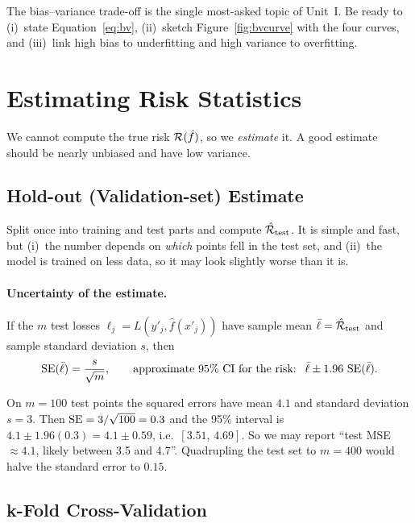 \begin{exam}
The bias--variance trade-off is the single most-asked topic of Unit~I. Be ready to (i)~state Equation~\eqref{eq:bv}, (ii)~sketch Figure~\ref{fig:bvcurve} with the four curves, and (iii)~link high bias to underfitting and high variance to overfitting.
\end{exam}

\section{Estimating Risk Statistics}

We cannot compute the true risk $\mathcal{R}(\hat f)$, so we \emph{estimate} it. A good estimate should be nearly unbiased and have low variance.

\subsection{Hold-out (Validation-set) Estimate}

Split once into training and test parts and compute $\hat{\mathcal{R}}_{\text{test}}$. It is simple and fast, but (i)~the number depends on \emph{which} points fell in the test set, and (ii)~the model is trained on less data, so it may look slightly worse than it is.

\paragraph{Uncertainty of the estimate.} If the $m$ test losses $\ell_j=L(y'_j,\hat f(x'_j))$ have sample mean $\bar\ell=\hat{\mathcal{R}}_{\text{test}}$ and sample standard deviation $s$, then
\[
  \operatorname{SE}(\bar\ell)=\frac{s}{\sqrt m},\qquad
  \text{approximate 95\% CI for the risk: }\ \bar\ell\pm 1.96\,\operatorname{SE}(\bar\ell).
\]

\begin{example}
On $m=100$ test points the squared errors have mean $4.1$ and standard deviation $s=3$. Then
$\operatorname{SE}=3/\sqrt{100}=0.3$ and the 95\% interval is $4.1\pm1.96(0.3)=4.1\pm0.59$, i.e.\ $[3.51,\,4.69]$. So we may report ``test MSE $\approx 4.1$, likely between 3.5 and 4.7''. Quadrupling the test set to $m=400$ would halve the standard error to $0.15$.
\end{example}

\subsection{k-Fold Cross-Validation}

